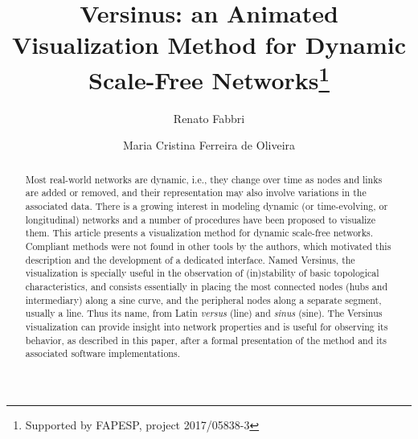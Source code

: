 \documentclass[runningheads]{llncs}
\begin{document}
%
\title{Versinus: an Animated Visualization Method for Dynamic Scale-Free Networks\thanks{Supported by FAPESP, project 2017/05838-3}}
%
%
\author{Renato Fabbri \and
Maria Cristina Ferreira de Oliveira}
%
%
%
\maketitle              %
%
\begin{abstract}
Most real-world networks are dynamic, i.e., they change over time as nodes and links are added or removed, and their representation may also involve variations in the associated data.
There is a growing interest in modeling dynamic (or time-evolving, or longitudinal) networks and
a number of procedures have been proposed to visualize them.
  This article presents a visualization method for dynamic scale-free networks.
  Compliant methods were not found in other tools by the authors, which motivated this description and the development of a dedicated interface.
  Named Versinus, the visualization is specially useful in the observation of (in)stability of basic topological characteristics, and consists essentially in placing the most connected nodes (hubs and intermediary) along a sine curve, and the peripheral nodes along a separate segment, usually a line.
  Thus its name, from  Latin \emph{versus} (line) and \emph{sinus} (sine).
  The Versinus visualization can provide insight into network properties and is useful for observing its behavior, as described in this paper, after a formal presentation of the method and its associated software implementations.
\end{abstract}
%
%
%
\end{document}
